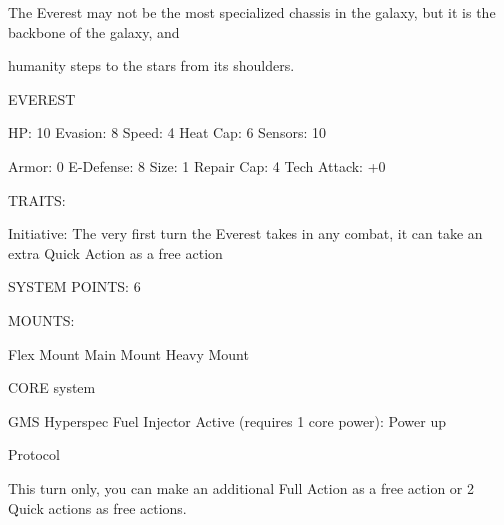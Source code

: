 The Everest may not be the most specialized chassis in the galaxy, but it is the backbone of the galaxy, and  

humanity steps to the stars from its shoulders. 
 

                                                      EVEREST 

  HP: 10          Evasion: 8                                Speed: 4             Heat Cap: 6          Sensors: 10 

 Armor: 0         E-Defense: 8                              Size: 1              Repair Cap: 4        Tech Attack:  
                                                                                                      +0 

                                                        TRAITS: 

  Initiative: The very first turn the Everest takes in any combat, it can take an extra Quick Action as a free  
 action 

                                                 SYSTEM POINTS: 6 

                                                                                                                       


                                                 MOUNTS: 

Flex Mount                        Main Mount                            Heavy Mount 

                                              CORE system 

                                      GMS Hyperspec Fuel Injector  
Active (requires 1 core power): Power up
 
Protocol
 
This turn only, you can make an additional Full Action as a free action or 2 Quick actions as free  
actions. 